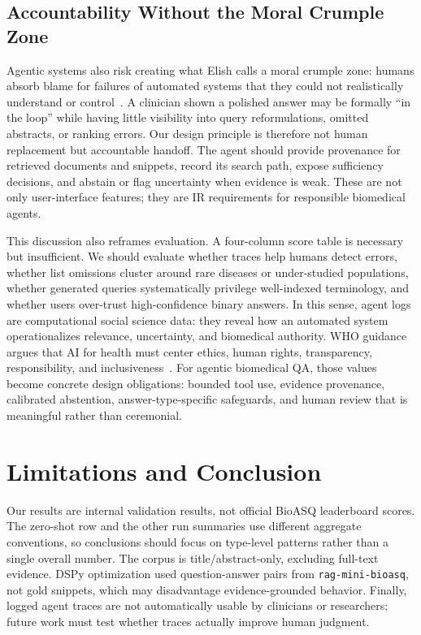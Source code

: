 \documentclass[sigconf,nonacm]{acmart}
\begin{document}
\subsection{Accountability Without the Moral Crumple Zone}

Agentic systems also risk creating what Elish calls a moral crumple zone: humans absorb blame for failures of automated systems that they could not realistically understand or control~\cite{elish2019}. A clinician shown a polished answer may be formally ``in the loop'' while having little visibility into query reformulations, omitted abstracts, or ranking errors. Our design principle is therefore not human replacement but accountable handoff. The agent should provide provenance for retrieved documents and snippets, record its search path, expose sufficiency decisions, and abstain or flag uncertainty when evidence is weak. These are not only user-interface features; they are IR requirements for responsible biomedical agents.

This discussion also reframes evaluation. A four-column score table is necessary but insufficient. We should evaluate whether traces help humans detect errors, whether list omissions cluster around rare diseases or under-studied populations, whether generated queries systematically privilege well-indexed terminology, and whether users over-trust high-confidence binary answers. In this sense, agent logs are computational social science data: they reveal how an automated system operationalizes relevance, uncertainty, and biomedical authority. WHO guidance argues that AI for health must center ethics, human rights, transparency, responsibility, and inclusiveness~\cite{who2021}. For agentic biomedical QA, those values become concrete design obligations: bounded tool use, evidence provenance, calibrated abstention, answer-type-specific safeguards, and human review that is meaningful rather than ceremonial.

\section{Limitations and Conclusion}

Our results are internal validation results, not official BioASQ leaderboard scores. The zero-shot row and the other run summaries use different aggregate conventions, so conclusions should focus on type-level patterns rather than a single overall number. The corpus is title/abstract-only, excluding full-text evidence. DSPy optimization used question-answer pairs from \texttt{rag-mini-bioasq}, not gold snippets, which may disadvantage evidence-grounded behavior. Finally, logged agent traces are not automatically usable by clinicians or researchers; future work must test whether traces actually improve human judgment.
\end{document}
